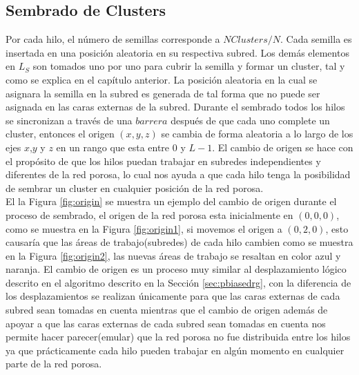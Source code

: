 \subsection{Sembrado de Clusters}
\label{subsec:pseeding}
Por cada hilo, el número de semillas corresponde a $NClusters/N$. Cada semilla es insertada en una posición aleatoria en su respectiva subred. Los demás elementos en $L_S$ son tomados uno por uno para cubrir la semilla y formar un cluster, tal y como se explica en el capítulo anterior. La posición aleatoria en la cual se asignara la semilla en la subred es generada de tal forma que no puede ser asignada en las caras externas de la subred. Durante el sembrado todos los hilos se sincronizan a través de una $barrera$ después de que cada uno complete un cluster, entonces el origen $(x, y, z)$ se cambia  de forma aleatoria a lo largo de los ejes $x$,$y$ y $z$ en un rango que esta entre $0$ y $L-1$. El cambio de origen se hace con el propósito de que los hilos puedan trabajar en subredes independientes y diferentes de la red porosa, lo cual nos ayuda a que cada hilo tenga la posibilidad de sembrar un cluster en cualquier posición de la red porosa.\\

El la Figura \ref{fig:origin} se muestra un ejemplo del cambio de origen durante el proceso de sembrado, el origen de la red porosa esta inicialmente en $(0,0,0)$, como se muestra en la Figura \ref{fig:origin1}, si movemos el origen a $(0,2,0)$, esto causaría que las áreas de trabajo(subredes) de cada hilo cambien como se muestra en la Figura \ref{fig:origin2}, las nuevas áreas de trabajo se resaltan en color azul y naranja. El cambio de origen es un proceso muy similar al desplazamiento lógico descrito en el algoritmo descrito en la Sección \ref{sec:pbiasedrg}, con la diferencia de los desplazamientos se realizan únicamente para que las caras externas de cada subred sean tomadas en cuenta mientras que el cambio de origen adem\'as de apoyar a que las caras externas de cada subred sean tomadas en cuenta nos permite hacer parecer(emular) que la red porosa no fue distribuida entre los hilos ya que prácticamente cada hilo pueden trabajar en algún momento en cualquier parte de la red porosa.\\

